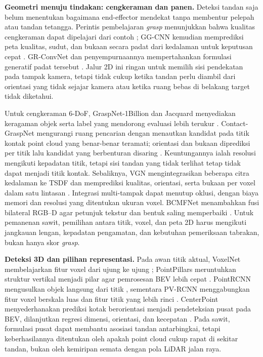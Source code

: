 \textbf{Geometri menuju tindakan: cengkeraman dan panen.} Deteksi tandan saja belum menentukan bagaimana end-effector mendekat tanpa membentur pelepah atau tandan tetangga. Perintis pembelajaran \textit{grasp} menunjukkan bahwa kualitas cengkeraman dapat dipelajari dari contoh \cite{lenz2015grasp}; GG-CNN kemudian memprediksi peta kualitas, sudut, dan bukaan secara padat dari kedalaman untuk keputusan cepat \cite{morrison2018ggcnn}. GR-ConvNet dan penyempurnaannya mempertahankan formulasi generatif padat tersebut \cite{kumra2020grconvnet,kumra2022grconvnetv2}. Jalur 2D ini ringan untuk memilih sisi pendekatan pada tampak kamera, tetapi tidak cukup ketika tandan perlu diambil dari orientasi yang tidak sejajar kamera atau ketika ruang bebas di belakang target tidak diketahui.

Untuk cengkeraman 6-DoF, GraspNet-1Billion dan Jacquard menyediakan keragaman objek serta label yang mendorong evaluasi lebih terukur \cite{fang2020graspnet,depierre2018jacquard}. Contact-GraspNet mengurangi ruang pencarian dengan menautkan kandidat pada titik kontak point cloud yang benar-benar teramati; orientasi dan bukaan diprediksi per titik lalu kandidat yang berbenturan disaring \cite{sundermeyer2021contactgraspnet}. Keuntungannya ialah resolusi mengikuti kepadatan titik, tetapi sisi tandan yang tidak terlihat tetap tidak dapat menjadi titik kontak. Sebaliknya, VGN mengintegrasikan beberapa citra kedalaman ke TSDF dan memprediksi kualitas, orientasi, serta bukaan per voxel dalam satu lintasan \cite{breyer2021vgn}. Integrasi multi-tampak dapat menutup oklusi, dengan biaya memori dan resolusi yang ditentukan ukuran voxel. BCMFNet menambahkan fusi bilateral RGB--D agar petunjuk tekstur dan bentuk saling memperbaiki \cite{zhang2023bcmfnet}. Untuk pemanenan sawit, pemilihan antara titik, voxel, dan peta 2D harus mengikuti jangkauan lengan, kepadatan pengamatan, dan kebutuhan pemeriksaan tabrakan, bukan hanya skor \textit{grasp}.

\textbf{Deteksi 3D dan pilihan representasi.} Pada awan titik aktual, VoxelNet membelajarkan fitur voxel dari ujung ke ujung \cite{zhou2018voxelnet}; PointPillars meruntuhkan struktur vertikal menjadi pilar agar pemrosesan BEV lebih cepat \cite{lang2019pointpillars}. PointRCNN mengusulkan objek langsung dari titik \cite{shi2019pointrcnn}, sementara PV-RCNN menggabungkan fitur voxel berskala luas dan fitur titik yang lebih rinci \cite{shi2020pvrcnn}. CenterPoint menyederhanakan prediksi kotak berorientasi menjadi pendeteksian pusat pada BEV, dilanjutkan regresi dimensi, orientasi, dan kecepatan \cite{yin2021centerpoint}. Pada sawit, formulasi pusat dapat membantu asosiasi tandan antarbingkai, tetapi keberhasilannya ditentukan oleh apakah point cloud cukup rapat di sekitar tandan, bukan oleh kemiripan semata dengan pola LiDAR jalan raya.


